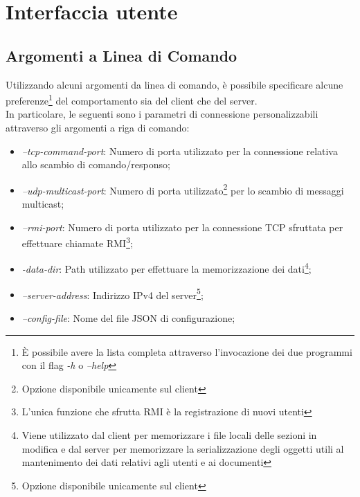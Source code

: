 \section{Interfaccia utente}
\subsection{Argomenti a Linea di Comando}
Utilizzando alcuni argomenti da linea di comando, è possibile specificare alcune preferenze\footnote{È possibile avere la lista completa attraverso l'invocazione dei due programmi con il flag \textit{-h} o \textit{--help} } del comportamento sia del client che del server. \\
In particolare, le seguenti sono i parametri di connessione personalizzabili attraverso gli argomenti a riga di comando:

\begin{itemize}
	\item\textit{--tcp-command-port}: Numero di porta utilizzato per la connessione relativa allo scambio di comando/responso;
	\item\textit{--udp-multicast-port}: Numero di porta utilizzato\footnote{Opzione disponibile unicamente sul client} per lo scambio di messaggi multicast;
	\item\textit{--rmi-port}: Numero di porta utilizzato per la connessione TCP sfruttata per effettuare chiamate RMI\footnote{L'unica funzione che sfrutta RMI è la registrazione di nuovi utenti};
	\item\textit{-data-dir}: Path utilizzato per effettuare la memorizzazione dei dati\footnote{Viene utilizzato dal client per memorizzare i file locali delle sezioni in modifica e dal server per memorizzare la serializzazione degli oggetti utili al mantenimento dei dati relativi agli utenti e ai documenti};
	\item\textit{--server-address}: Indirizzo IPv4 del server\footnote{Opzione disponibile unicamente sul client};
	\item\textit{--config-file}: Nome del file JSON di configurazione;
\end{itemize}
